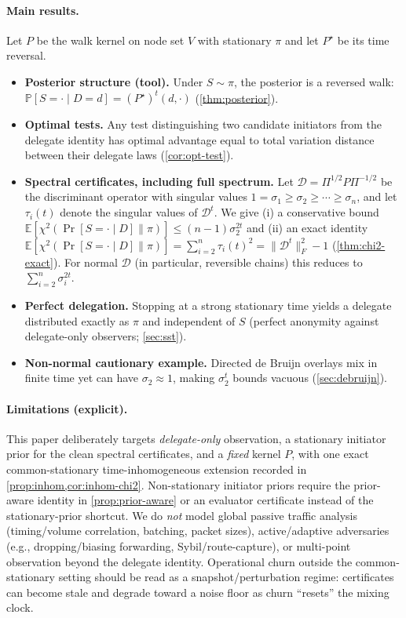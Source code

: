 \documentclass[11pt]{article}
\newcommand{\E}{\mathbb{E}}
\newcommand{\Prb}{\mathbb{P}}
\newcommand{\cD}{\mathcal{D}}
\begin{document}
\paragraph{Main results.}
Let $P$ be the walk kernel on node set $V$ with stationary $\pi$ and let $P^\star$
be its time reversal.
\begin{itemize}[leftmargin=1.2em]
\item \textbf{Posterior structure (tool).} Under $S\sim\pi$, the posterior is a
reversed walk: $\Prb[S=\cdot\mid D=d]=(P^\star)^t(d,\cdot)$ (\cref{thm:posterior}).
\item \textbf{Optimal tests.} Any test distinguishing two candidate initiators
from the delegate identity has optimal advantage equal to total variation
distance between their delegate laws (\cref{cor:opt-test}).
\item \textbf{Spectral certificates, including full spectrum.} Let
$\cD=\Pi^{1/2}P\Pi^{-1/2}$ be the discriminant operator with singular values
$1=\sigma_1\ge\sigma_2\ge\cdots\ge\sigma_n$, and let $\tau_i(t)$ denote the
singular values of $\cD^t$. We give (i) a conservative bound
$\E[\chi^2(\Pr[S=\cdot\mid D]\|\pi)]\le (n-1)\sigma_2^{2t}$ and (ii) an exact identity
$\E[\chi^2(\Pr[S=\cdot\mid D]\|\pi)]=\sum_{i=2}^n\tau_i(t)^2=\|\cD^t\|_F^2-1$
(\cref{thm:chi2-exact}). For normal $\cD$ (in particular, reversible chains) this reduces to $\sum_{i=2}^n\sigma_i^{2t}$.
\item \textbf{Perfect delegation.} Stopping at a strong stationary time yields a
delegate distributed exactly as $\pi$ and independent of $S$ (perfect anonymity
against delegate-only observers; \cref{sec:sst}).
\item \textbf{Non-normal cautionary example.} Directed de Bruijn overlays mix in
finite time yet can have $\sigma_2\approx 1$, making $\sigma_2^t$ bounds vacuous
(\cref{sec:debruijn}).
\end{itemize}

\paragraph{Limitations (explicit).}
This paper deliberately targets \emph{delegate-only} observation, a stationary
initiator prior for the clean spectral certificates, and a \emph{fixed} kernel
$P$, with one exact common-stationary time-inhomogeneous extension recorded in
\cref{prop:inhom,cor:inhom-chi2}.  Non-stationary initiator priors require the
prior-aware identity in \cref{prop:prior-aware} or an evaluator certificate
instead of the stationary-prior shortcut. We do \emph{not} model
global passive traffic analysis (timing/volume correlation, batching, packet
sizes), active/adaptive adversaries (e.g., dropping/biasing forwarding,
Sybil/route-capture), or multi-point observation beyond the delegate identity.
Operational churn outside the common-stationary setting should be read as a
snapshot/perturbation regime: certificates can become stale and degrade toward a
noise floor as churn ``resets'' the mixing clock.
\end{document}
